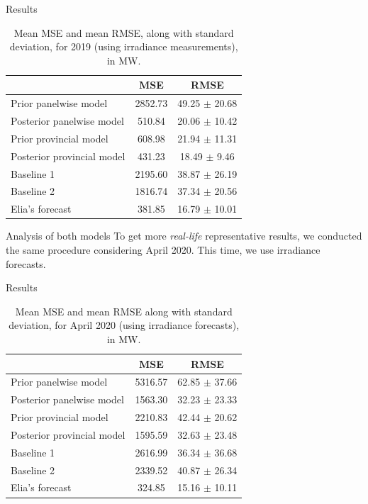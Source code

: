 \documentclass[12pt]{beamer}
\begin{document}
\begin{frame}{Results}
    \begin{table}[H]
\centering
\begin{tabular}{l|c|c}
                           & MSE     & RMSE
                           \\ \hline
Prior panelwise model      & 2852.73 & 49.25 $\pm$ 20.68
\\\hline
\alert{Posterior panelwise model}  & 510.84  & 20.06 $\pm$ 10.42 \\ \hline
Prior provincial model     & 608.98  & 21.94 $\pm$ 11.31 \\ \hline
\alert{Posterior provincial model} & 431.23  & 18.49 $\pm$ 9.46  \\ \hline
Baseline 1                 & 2195.60 & 38.87 $\pm$ 26.19 \\ \hline
Baseline 2                 & 1816.74 & 37.34 $\pm$ 20.56 \\ \hline
\alert{Elia's forecast}            & 381.85  & 16.79 $\pm$ 10.01
\end{tabular}
\caption{Mean MSE and mean RMSE, along with standard deviation, for 2019 (using irradiance measurements), in \si{\mega\watt}.}
\end{table}
\end{frame}

\begin{frame}{Analysis of both models}
    To get more \emph{real-life} representative results, we conducted the same procedure considering April 2020. This time, we use irradiance \alert{forecasts}.
\end{frame}

\begin{frame}{Results}
    \begin{table}[]
\centering
\begin{tabular}{l|c|c}
                           & MSE     & RMSE              \\ \hline
Prior panelwise model      & 5316.57 & 62.85 $\pm$ 37.66 \\ \hline
\alert{Posterior panelwise model}  & 1563.30 & 32.23 $\pm$ 23.33 \\ \hline
Prior provincial model     & 2210.83 & 42.44 $\pm$ 20.62 \\ \hline
\alert{Posterior provincial model} & 1595.59 & 32.63 $\pm$ 23.48 \\ \hline
Baseline 1                 & 2616.99 & 36.34 $\pm$ 36.68 \\ \hline
Baseline 2                 & 2339.52 & 40.87 $\pm$ 26.34 \\ \hline
\alert{Elia's forecast}            & 324.85  & 15.16 $\pm$ 10.11
\end{tabular}
\caption{Mean MSE and mean RMSE along with standard deviation, for April 2020 (using irradiance forecasts), in \si{\mega\watt}.}
\end{table}
\end{frame}
\end{document}
